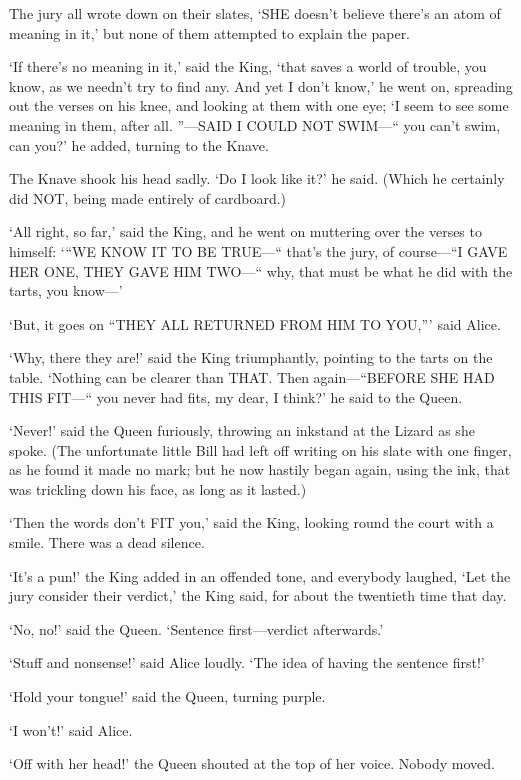 \documentclass[12pt]{article}
\begin{document}
\begin{Parallel}[p]{}{}
{The jury all wrote down on their slates, ‘SHE doesn’t believe there’s an atom of meaning in it,’ but none of them attempted to explain the paper.

‘If there’s no meaning in it,’ said the King, ‘that saves a world of trouble, you know, as we needn’t try to find any. And yet I don’t know,’ he went on, spreading out the verses on his knee, and looking at them with one eye; ‘I seem to see some meaning in them, after all. ”—SAID I COULD NOT SWIM—“ you can’t swim, can you?’ he added, turning to the Knave.

The Knave shook his head sadly. ‘Do I look like it?’ he said. (Which he certainly did NOT, being made entirely of cardboard.)

‘All right, so far,’ said the King, and he went on muttering over the verses to himself: ‘“WE KNOW IT TO BE TRUE—“ that’s the jury, of course—“I GAVE HER ONE, THEY GAVE HIM TWO—“ why, that must be what he did with the tarts, you know—’

‘But, it goes on “THEY ALL RETURNED FROM HIM TO YOU,”’ said Alice.

‘Why, there they are!’ said the King triumphantly, pointing to the tarts on the table. ‘Nothing can be clearer than THAT. Then again—“BEFORE SHE HAD THIS FIT—“ you never had fits, my dear, I think?’ he said to the Queen.

‘Never!’ said the Queen furiously, throwing an inkstand at the Lizard as she spoke. (The unfortunate little Bill had left off writing on his slate with one finger, as he found it made no mark; but he now hastily began again, using the ink, that was trickling down his face, as long as it lasted.)

‘Then the words don’t FIT you,’ said the King, looking round the court with a smile. There was a dead silence.

‘It’s a pun!’ the King added in an offended tone, and everybody laughed, ‘Let the jury consider their verdict,’ the King said, for about the twentieth time that day.

‘No, no!’ said the Queen. ‘Sentence first—verdict afterwards.’

‘Stuff and nonsense!’ said Alice loudly. ‘The idea of having the sentence first!’

‘Hold your tongue!’ said the Queen, turning purple.

‘I won’t!’ said Alice.

‘Off with her head!’ the Queen shouted at the top of her voice. Nobody moved.

}
\end{Parallel}
\end{document}
